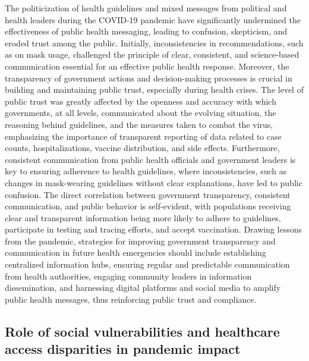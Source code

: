 \documentclass[
  letterpaper,
  DIV=11,
  numbers=noendperiod]{scrartcl}
\begin{document}
The politicization of health guidelines and mixed messages from
political and health leaders during the COVID-19 pandemic have
significantly undermined the effectiveness of public health messaging,
leading to confusion, skepticism, and eroded trust among the public.
Initially, inconsistencies in recommendations, such as on mask usage,
challenged the principle of clear, consistent, and science-based
communication essential for an effective public health response.
Moreover, the transparency of government actions and decision-making
processes is crucial in building and maintaining public trust,
especially during health crises. The level of public trust was greatly
affected by the openness and accuracy with which governments, at all
levels, communicated about the evolving situation, the reasoning behind
guidelines, and the measures taken to combat the virus, emphasizing the
importance of transparent reporting of data related to case counts,
hospitalizations, vaccine distribution, and side effects. Furthermore,
consistent communication from public health officials and government
leaders is key to ensuring adherence to health guidelines, where
inconsistencies, such as changes in mask-wearing guidelines without
clear explanations, have led to public confusion. The direct correlation
between government transparency, consistent communication, and public
behavior is self-evident, with populations receiving clear and
transparent information being more likely to adhere to guidelines,
participate in testing and tracing efforts, and accept vaccination.
Drawing lessons from the pandemic, strategies for improving government
transparency and communication in future health emergencies should
include establishing centralized information hubs, ensuring regular and
predictable communication from health authorities, engaging community
leaders in information dissemination, and harnessing digital platforms
and social media to amplify public health messages, thus reinforcing
public trust and compliance.

\hypertarget{role-of-social-vulnerabilities-and-healthcare-access-disparities-in-pandemic-impact}{%
\subsection{Role of social vulnerabilities and healthcare access
disparities in pandemic
impact}\label{role-of-social-vulnerabilities-and-healthcare-access-disparities-in-pandemic-impact}}
\end{document}
